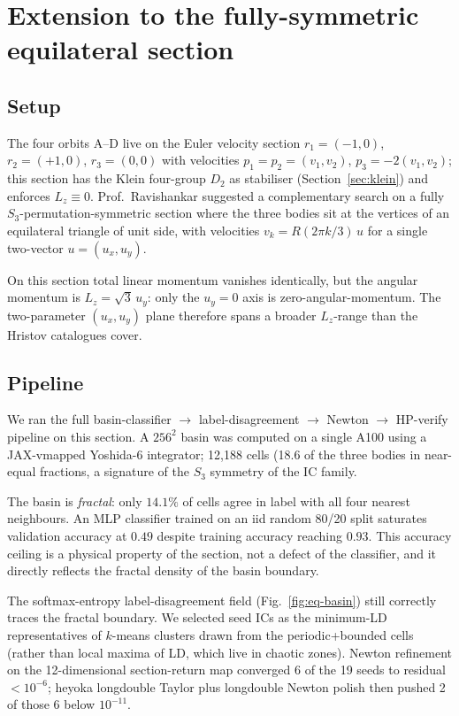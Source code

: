 \section{Extension to the fully-symmetric equilateral section}
\label{sec:equilateral}

\subsection{Setup}

The four orbits A--D live on the Euler velocity section
$r_1 = (-1, 0)$, $r_2 = (+1, 0)$, $r_3 = (0, 0)$ with velocities
$p_1 = p_2 = (v_1, v_2)$, $p_3 = -2(v_1, v_2)$; this section has the
Klein four-group $D_2$ as stabiliser (Section~\ref{sec:klein}) and enforces
$L_z \equiv 0$. Prof.~Ravishankar suggested a complementary search on a
fully $S_3$-permutation-symmetric section where the three bodies sit at the
vertices of an equilateral triangle of unit side, with velocities
$v_k = R(2\pi k/3)\, u$ for a single two-vector $u = (u_x, u_y)$.

On this section total linear momentum vanishes identically, but the angular
momentum is $L_z = \sqrt{3}\, u_y$: only the $u_y = 0$ axis is
zero-angular-momentum. The two-parameter $(u_x, u_y)$ plane therefore spans a
broader $L_z$-range than the Hristov catalogues cover.

\subsection{Pipeline}

We ran the full basin-classifier $\to$ label-disagreement $\to$ Newton $\to$
HP-verify pipeline on this section. A $256^2$ basin was computed on a single
A100 using a JAX-vmapped Yoshida-6 integrator; 12,188 cells
(18.6%
of the three bodies in near-equal fractions, a signature of the $S_3$ symmetry
of the IC family.

The basin is \emph{fractal}: only $14.1\%$ of cells agree in
label with all four nearest neighbours. An MLP classifier trained on an iid
random 80/20 split saturates validation accuracy at $0.49$ despite
training accuracy reaching $0.93$. This accuracy ceiling is a
physical property of the section, not a defect of the classifier, and it
directly reflects the fractal density of the basin boundary.

The softmax-entropy label-disagreement field (Fig.~\ref{fig:eq-basin}) still
correctly traces the fractal boundary. We selected seed ICs as the minimum-LD
representatives of $k$-means clusters drawn from the periodic+bounded cells
(rather than local maxima of LD, which live in chaotic zones). Newton
refinement on the 12-dimensional section-return map converged 6 of
the 19 seeds to residual $< 10^{-6}$; heyoka longdouble Taylor
plus longdouble Newton polish then pushed 2 of those 6 below
$10^{-11}$.

